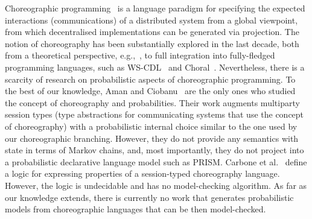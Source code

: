   Choreographic programming~\cite{M23} is a
language paradigm for specifying the expected interactions
(communications) of a distributed system from a global viewpoint,
from which decentralised implementations can be generated via
projection. The notion of choreography has been substantially explored
in the last decade, both from a theoretical perspective,
e.g.,~\cite{CHY12,CM13}, to full integration into fully-fledged
programming languages, such as WS-CDL~\cite{HYC07b} and
Choral~\cite{GMP24}. Nevertheless, there is a scarcity of research on
probabilistic aspects of choreographic programming.
To the best of our knowledge, Aman and Ciobanu~\cite{AC19,AC22} are
the only ones who studied the concept of choreography and
probabilities. Their work augments multiparty session types (type
abstractions for communicating systems that use the concept of
choreography) with a probabilistic internal choice similar to the one
used by our choreographic branching. However, they do not provide any
semantics with state in terms of Markov chains, and, most importantly,
they do not project into a probabilistic declarative language model
such as PRISM.
Carbone et al.~\cite{CGHL10} define a logic for expressing properties
of a session-typed choreography language. However, the logic is
undecidable and has no model-checking algorithm. %
As far as our knowledge extends, there is currently no work that
generates probabilistic models from choreographic languages that can
be then model-checked.




